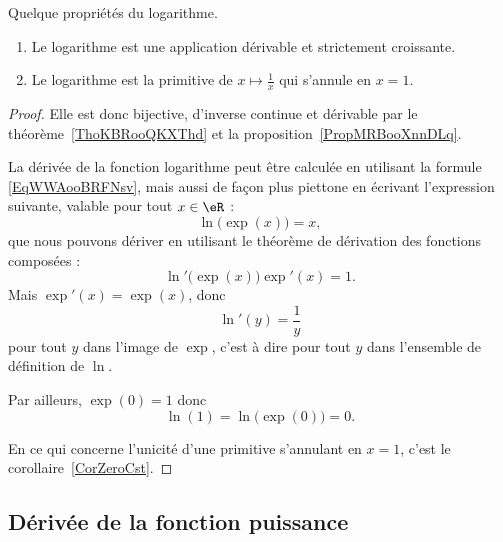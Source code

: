 \begin{proposition}\label{ExZLMooMzYqfK}
    Quelque propriétés du logarithme.
    \begin{enumerate}
        \item
            Le logarithme est une application dérivable et strictement croissante.
        \item
            Le logarithme est la primitive de \( x\mapsto\frac{1}{ x }\) qui s'annule en \( x=1\).
    \end{enumerate}
\end{proposition}

\begin{proof}
    Elle est donc bijective, d'inverse continue et dérivable par le théorème~\ref{ThoKBRooQKXThd} et la proposition~\ref{PropMRBooXnnDLq}.

    La dérivée de la fonction logarithme peut être calculée en utilisant la formule \eqref{EqWWAooBRFNsv}, mais aussi de façon plus piettone en écrivant l'expression suivante, valable pour tout \( x\in \eR\) :
    \begin{equation}
        \ln\big( \exp(x) \big)=x,
    \end{equation}
    que nous pouvons dériver en utilisant le théorème de dérivation des fonctions composées :
    \begin{equation}
        \ln'\big( \exp(x) \big)\exp'(x)=1.
    \end{equation}
    Mais \( \exp'(x)=\exp(x)\), donc
    \begin{equation}
        \ln'(y)=\frac{1}{ y }
    \end{equation}
    pour tout \( y\) dans l'image de \( \exp\), c'est à dire pour tout \( y\) dans l'ensemble de définition de \( \ln\).

    Par ailleurs, \( \exp(0)=1\) donc
    \begin{equation}
        \ln(1)=\ln\big( \exp(0) \big)=0.
    \end{equation}

    En ce qui concerne l'unicité d'une primitive s'annulant en \( x=1\), c'est le corollaire~\ref{CorZeroCst}.
\end{proof}

\subsection{Dérivée de la fonction puissance}

